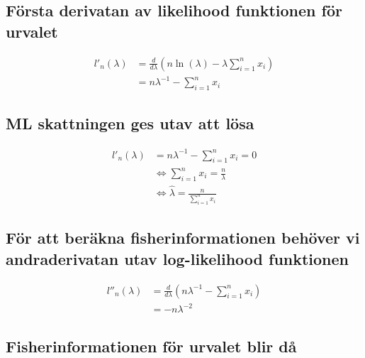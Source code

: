 \documentclass[
]{article}
\begin{document}
\hypertarget{fuxf6rsta-derivatan-av-likelihood-funktionen-fuxf6r-urvalet}{%
\subsection{Första derivatan av likelihood funktionen för
urvalet}\label{fuxf6rsta-derivatan-av-likelihood-funktionen-fuxf6r-urvalet}}

\[
\begin{aligned}
l'_n(\lambda) &= \frac{d }{d\lambda}(n\ln(\lambda) - \lambda\sum_{i=1}^{n}x_i) \\
              &= n\lambda^{-1} - \sum_{i=1}^{n}x_i 
\end{aligned}
\]

\hypertarget{ml-skattningen-ges-utav-att-luxf6sa}{%
\subsection{ML skattningen ges utav att
lösa}\label{ml-skattningen-ges-utav-att-luxf6sa}}

\[
\begin{aligned}
l'_n(\lambda) &= n\lambda^{-1} - \sum_{i=1}^{n}x_i = 0 \\
              &\Leftrightarrow \sum_{i=1}^{n}x_i = \frac{n}{\lambda} \\
              &\Leftrightarrow \hat\lambda = \frac{n}{\sum_{i=1}^{n}x_i}
\end{aligned}
\]

\hypertarget{fuxf6r-att-beruxe4kna-fisherinformationen-behuxf6ver-vi-andraderivatan-utav-log-likelihood-funktionen}{%
\subsection{För att beräkna fisherinformationen behöver vi
andraderivatan utav log-likelihood
funktionen}\label{fuxf6r-att-beruxe4kna-fisherinformationen-behuxf6ver-vi-andraderivatan-utav-log-likelihood-funktionen}}

\[
\begin{aligned}
l''_n(\lambda) &= \frac{d }{d\lambda}(n\lambda^{-1} - \sum_{i=1}^{n}x_i) \\
               &= -n\lambda^{-2} 
\end{aligned}
\]

\hypertarget{fisherinformationen-fuxf6r-urvalet-blir-duxe5}{%
\subsection{Fisherinformationen för urvalet blir
då}\label{fisherinformationen-fuxf6r-urvalet-blir-duxe5}}
\end{document}
